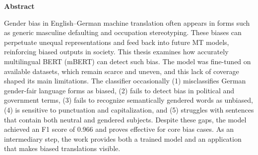 \thispagestyle{empty}


\vspace*{1cm}

\begin{center}
    \textbf{Abstract}
\end{center}

\vspace*{1cm}

\noindent 
Gender bias in English–German machine translation often appears in forms such as generic masculine defaulting and occupation stereotyping. These biases can perpetuate unequal representations and feed back into future MT models, reinforcing biased outputs in society. This thesis examines how accurately multilingual BERT (mBERT) can detect such bias. The model was fine-tuned on available datasets, which remain scarce and uneven, and this lack of coverage shaped its main limitations. The classifier occasionally (1) misclassifies German gender-fair language forms as biased, (2) fails to detect bias in political and government terms, (3) fails to recognize semantically gendered words as unbiased, (4) is sensitive to punctuation and capitalization, and (5) struggles with sentences that contain both neutral and gendered subjects. Despite these gaps, the model achieved an F1 score of 0.966 and proves effective for core bias cases. As an intermediary step, the work provides both a trained model and an application that makes biased translations visible.

